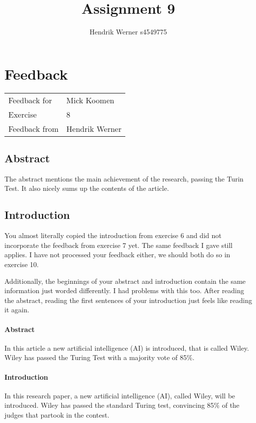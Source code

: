 \documentclass[12pt, a4paper]{article}
\title{Assignment 9}
\author{Hendrik Werner s4549775}
\begin{document}
\maketitle

\clearpage
\section{Feedback}

\begin{tabular}{ll}
	Feedback for & Mick Koomen\\
	Exercise & 8\\
	Feedback from & Hendrik Werner\\
\end{tabular}

\subsection{Abstract}
The abstract mentions the main achievement of the research, passing the Turin Test. It also nicely sums up the contents of the article.

\subsection{Introduction}
You almost literally copied the introduction from exercise 6 and did not incorporate the feedback from exercise 7 yet. The same feedback I gave still applies. I have not processed your feedback either, we should both do so in exercise 10.

Additionally, the beginnings of your abstract and introduction contain the same information just worded differently. I had problems with this too. After reading the abstract, reading the first sentences of your introduction just feels like reading it again.

\begin{multicols}{2}
	\paragraph{Abstract} In this article a new artificial intelligence (AI) is introduced, that is called Wiley. Wiley has passed the Turing Test with a majority vote of 85\%.

	\paragraph{Introduction} In this research paper, a new artificial intelligence (AI), called Wiley, will be
introduced. Wiley has passed the standard Turing test, convincing 85\% of the
judges that partook in the contest.
\end{multicols}

\printbibliography
\end{document}
